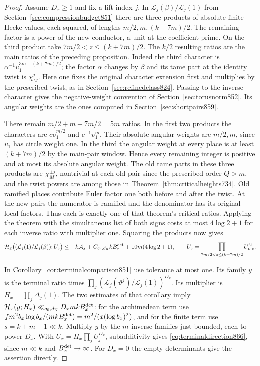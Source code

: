 \documentclass[a4paper,11pt]{article}
\theoremstyle{definition}
\theoremstyle{remark}
\numberwithin{equation}{section}
\begin{document}
\begin{proof}
Assume \(D_x\ge1\) and fix a lift index \(j\). In
\(\mathcal L_j(\beta)/\mathcal L_j(1)\) from
Section~\ref{sec:compressionbudget851} there are three products
of absolute finite Hecke values, each squared, of lengths
\(m/2,m,(k+7m)/2\). The remaining factor is a power of the new
conductor, a unit at the coefficient prime. On the third product
take \(7m/2<z\le(k+7m)/2\). The \(k/2\) resulting ratios are
the main ratios of the preceding proposition. Indeed the
third character is \(\alpha^{-1}\upsilon_1^{3m+(k+7m)/2}\);
the factor \(\alpha\) changes by \(\beta\) and its tame part at
the identity twist is \(\chi_M^j\). Here one fixes the original
character extension first and multiplies by the prescribed
twist, as in Section~\ref{sec:refinedclass824}. Passing to the
inverse character gives the negative-weight convention of
Section~\ref{sec:torusnorm852}. Its angular weights are the
ones computed in Section~\ref{sec:shortpairs859}.

There remain \(m/2+m+7m/2=5m\) ratios. In the first two
products the characters are \(c\upsilon_1^{m/2}\) and
\(c^{-1}\upsilon_1^m\). Their absolute angular weights
are \(m/2,m\), since \(\upsilon_1\) has circle weight one.
In the third the angular weight at every place is at least
\((k+7m)/2\) by the main-pair window. Hence every remaining
integer is positive and at most its absolute angular weight.
The old tame parts in these three products are
\(\chi_M^{\pm j}\), nontrivial at each old pair since the
prescribed order \(Q>m\), and the twist powers are among
those in Theorem~\ref{thm:criticalheights734}. Old ramified
places contribute Euler factor one both before and after
the twist. At the new pairs the numerator is ramified
and the denominator has its original local factors.
Thus each is exactly one of that theorem's critical ratios.
Applying the theorem with the simultaneous list of both signs
costs at most \(4\log2+1\) for each inverse ratio with
multiplier one. Squaring the products now gives
\[
 \mathcal H_x\big((\mathcal L_j(1)/\mathcal L_j(\beta));U_j\big)
       \le -k\mathcal A_x+C_{q_0,d_{\rm K}}k B_x^{\rm det}
                                     +10m(4\log2+1),
 \qquad U_j=\prod_{7m/2<z\le(k+7m)/2} U_{\nu,z}^{\,2}.
\]

In Corollary~\ref{cor:terminalcomparison851} use tolerance
at most one. Its family \(y\) is the terminal ratio times
\(\prod_j(\mathcal L_j(\vartheta^j)/\mathcal L_j(1))^{D_x}\).
Its multiplier is \(H_x=\prod_j\Delta_j(1)\). The two
estimates of that corollary imply
\(\mathcal H_x(y;H_x)\ll_{q_0,d_{\rm K}}D_x m k B_x^{\rm det}\):
for the archimedean term use
\(f m^2b_x\log b_x/(mk B_x^{\rm det})
=m^2/(x(\log b_x)^2)\), and for the finite term use
\(s=k+m-1\ll k\). Multiply \(y\) by the \(m\) inverse
families just bounded, each to power \(D_x\). With
\(U_x=H_x\prod_j U_j^{D_x}\), subadditivity gives
\eqref{eq:terminaldirection866}, since \(m\ll k\) and
\(B_x^{\rm det}\to\infty\). For \(D_x=0\) the empty
determinants give the assertion directly.
\end{proof}
\end{document}
